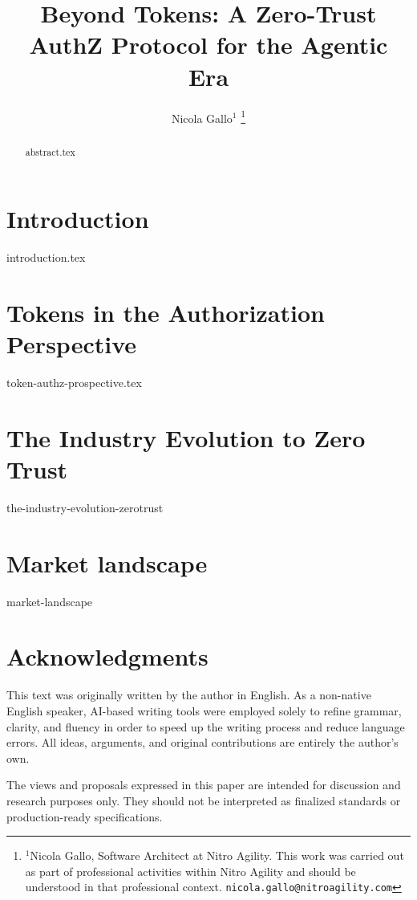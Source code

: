 \documentclass[letterpaper, 10 pt, conference]{ieeeconf}  %
\title{\LARGE \bf
Beyond Tokens: A Zero-Trust AuthZ Protocol for the Agentic Era
}
\author{Nicola Gallo$^{1}$%
\thanks{$^{1}$Nicola Gallo, Software Architect at Nitro Agility. 
This work was carried out as part of professional activities within Nitro Agility and should be understood in that professional context. 
{\tt\small nicola.gallo@nitroagility.com}}%
}
\begin{document}
\maketitle
\thispagestyle{empty}
\pagestyle{empty}

\begin{abstract}
{abstract.tex}
\end{abstract}

\section{Introduction}
\label{sec:introduction}
{introduction.tex}

\section{Tokens in the Authorization Perspective}
\label{sec:token-authz-prospective}
{token-authz-prospective.tex}

\section{The Industry Evolution to Zero Trust}
\label{sec:the-industry-evolution-zerotrust}
{the-industry-evolution-zerotrust}

\section{Market landscape}
\label{sec:market-landscape}
{market-landscape}

\section*{Acknowledgments}
This text was originally written by the author in English. 
As a non-native English speaker, AI-based writing tools were employed solely to refine grammar, clarity, and fluency in order to speed up the writing process and reduce language errors.
All ideas, arguments, and original contributions are entirely the author's own.

\vspace{1em}
The views and proposals expressed in this paper are intended for discussion and research purposes only. 
They should not be interpreted as finalized standards or production-ready specifications.
\end{document}

